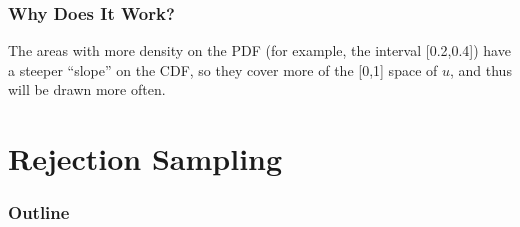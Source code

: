 \documentclass{beamer}
\begin{document}
\begin{frame}
\frametitle{Why Does It Work?}
\pause
\begin{figure}[!htp]
\begin{center}
\end{center}
\end{figure}
\pause
The areas with more density on the PDF (for example, the interval [0.2,0.4])
have a steeper ``slope'' on the CDF, so they cover more of the [0,1]
space of $u$, and thus will be drawn more often.
\end{frame}

\section{Rejection Sampling}

\begin{frame}
\frametitle{Outline}
\tableofcontents[currentsection]
\end{frame}
\end{document}
